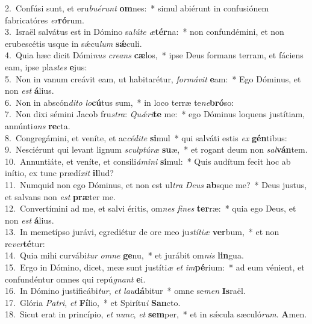 {2.~}Confúsi sunt, et eru\textit{bu}\textit{é}\textit{runt} \textbf{om}nes:~* simul abiérunt in confusiónem fabricatóres \textit{er}\textbf{ró}rum.\\
{3.~}Israël salvátus est in Dómino sa\textit{lú}\textit{te} \textit{æ}\textbf{tér}na:~* non confundémini, et non erubescétis usque in sǽcu\textit{lum} \textbf{sǽ}culi.\\
{4.~}Quia hæc dicit Dómi\textit{nus} \textit{cre}\textit{ans} \textbf{cæ}los,~* ipse Deus formans terram, et fáciens eam, ipse pla\textit{stes} \textbf{e}jus:\\
{5.~}Non in vanum creávit eam, ut habitarétur, \textit{for}\textit{má}\textit{vit} \textbf{e}am:~* Ego Dóminus, et non \textit{est} \textbf{á}lius.\\
{6.~}Non in abscón\textit{di}\textit{to} \textit{lo}\textbf{cú}tus sum,~* in loco terræ te\textit{ne}\textbf{bró}so:\\
{7.~}Non dixi sémini Jacob fru\textit{stra}: \textit{Quǽ}\textit{ri}\textbf{te} me:~* ego Dóminus loquens justítiam, annúnti\textit{ans} \textbf{re}cta.\\
{8.~}Congregámini, et veníte, et ac\textit{cé}\textit{di}\textit{te} \textbf{si}mul~* qui salváti estis \textit{ex} \textbf{gén}tibus:\\
{9.~}Nesciérunt qui levant lignum \textit{scul}\textit{ptú}\textit{ræ} \textbf{su}æ,~* et rogant deum non \textit{sal}\textbf{ván}tem.\\
{10.~}Annuntiáte, et veníte, et consili\textit{á}\textit{mi}\textit{ni} \textbf{si}mul:~* Quis audítum fecit hoc ab inítio, ex tunc prædí\textit{xit} \textbf{il}lud?\\
{11.~}Numquid non ego Dóminus, et non est ul\textit{tra} \textit{De}\textit{us} \textbf{ab}sque me?~* Deus justus, et salvans non \textit{est} \textbf{præ}ter me.\\
{12.~}Convertímini ad me, et salvi éritis, om\textit{nes} \textit{fi}\textit{nes} \textbf{ter}ræ:~* quia ego Deus, et non \textit{est} \textbf{á}lius.\\
{13.~}In memetípso jurávi, egrediétur de ore meo ju\textit{stí}\textit{ti}\textit{æ} \textbf{ver}bum,~* et non re\textit{ver}\textbf{té}tur:\\
{14.~}Quia mihi curvábi\textit{tur} \textit{om}\textit{ne} \textbf{ge}nu,~* et jurábit om\textit{nis} \textbf{lin}gua.\\
{15.~}Ergo in Dómino, dicet, meæ sunt justíti\textit{æ} \textit{et} \textit{im}\textbf{pé}rium:~* ad eum vénient, et confundéntur omnes qui repú\textit{gnant} \textbf{e}i.\\
{16.~}In Dómino justificábi\textit{tur}, \textit{et} \textit{lau}\textbf{dá}bitur~* omne se\textit{men} \textbf{Is}raël.\\
{17.~}Glória \textit{Pa}\textit{tri}, \textit{et} \textbf{Fí}lio,~* et Spirítu\textit{i} \textbf{San}cto.\\
{18.~}Sicut erat in princípio, \textit{et} \textit{nunc}, \textit{et} \textbf{sem}per,~* et in sǽcula sæculó\textit{rum}. \textbf{A}men.\\
